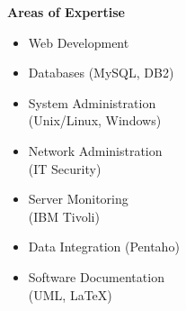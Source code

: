 %
\hfill
%
\begin{minipage}[t]{.35\linewidth}
\vspace{0pt}
\textbf{Areas of Expertise}
\begin{itemize}[itemsep=0pt]
    \item Web Development
    \item Databases (MySQL, DB2)
    \item System Administration \\ (Unix/Linux, Windows)
    \item Network Administration \\ (IT Security)
    \item Server Monitoring \\ (IBM Tivoli)
    \item Data Integration (Pentaho)
    \item Software Documentation \\ (UML, LaTeX)
\end{itemize}
\end{minipage}